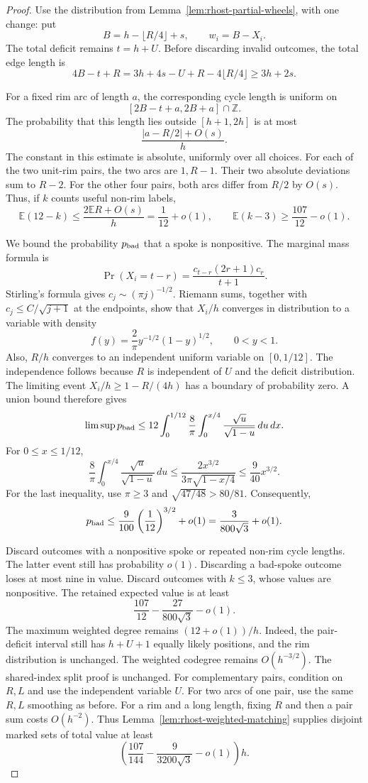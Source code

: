 \begin{proof}
Use the distribution from Lemma~\ref{lem:rhost-partial-wheels}, with one change:
put
\[
 B=h-\lfloor R/4\rfloor+s,\qquad w_i=B-X_i.
\]
The total deficit remains $t=h+U$.
Before discarding invalid outcomes, the total edge length is
\[
 4B-t+R=3h+4s-U+R-4\lfloor R/4\rfloor\ge3h+2s.
\]

For a fixed rim arc of length $a$, the corresponding cycle length is uniform on
\[
 [2B-t+a,2B+a]\cap\mathbb Z.
\]
The probability that this length lies outside $[h+1,2h]$ is at most
\[
 \frac{|a-R/2|+O(s)}h.
\]
The constant in this estimate is absolute, uniformly over all choices.
For each of the two unit-rim pairs, the two arcs are $1,R-1$.
Their two absolute deviations sum to $R-2$.
For the other four pairs, both arcs differ from $R/2$ by $O(s)$.
Thus, if $k$ counts useful non-rim labels,
\[
 \mathbb E(12-k)\le\frac{2\mathbb E R+O(s)}h=\frac1{12}+o(1),
 \qquad \mathbb E(k-3)\ge\frac{107}{12}-o(1).
\]

We bound the probability $p_{\rm bad}$ that a spoke is nonpositive.
The marginal mass formula is
\[
 \Pr(X_i=t-r)=\frac{c_{t-r}(2r+1)c_r}{t+1}.
\]
Stirling's formula gives $c_j\sim(\pi j)^{-1/2}$.
Riemann sums, together with $c_j\le C/\sqrt{j+1}$ at the endpoints, show that $X_i/h$
converges in distribution to a variable with density
\[
 f(y)=\frac2\pi y^{-1/2}(1-y)^{1/2},\qquad 0<y<1.
\]
Also, $R/h$ converges to an independent uniform variable on $[0,1/12]$.
The independence follows because $R$ is independent of $U$ and the deficit distribution.
The limiting event $X_i/h\ge1-R/(4h)$ has a boundary of probability zero.
A union bound therefore gives
\[
 \limsup p_{\rm bad}
 \le 12\int_0^{1/12}\frac8\pi
       \int_0^{x/4}\frac{\sqrt u}{\sqrt{1-u}}\,du\,dx.
\]
For $0\le x\le1/12$,
\[
 \frac8\pi\int_0^{x/4}\frac{\sqrt u}{\sqrt{1-u}}\,du
 \le\frac{2x^{3/2}}{3\pi\sqrt{1-x/4}}
 \le\frac9{40}x^{3/2}.
\]
For the last inequality, use $\pi\ge3$ and $\sqrt{47/48}>80/81$.
Consequently,
\[
 p_{\rm bad}\le\frac9{100}\left(\frac1{12}\right)^{3/2}+o(1)
             =\frac3{800\sqrt3}+o(1).
\]

Discard outcomes with a nonpositive spoke or repeated non-rim cycle lengths.
The latter event still has probability $o(1)$.
Discarding a bad-spoke outcome loses at most nine in value.
Discard outcomes with $k\le3$, whose values are nonpositive.
The retained expected value is at least
\[
 \frac{107}{12}-\frac{27}{800\sqrt3}-o(1).
\]
The maximum weighted degree remains $(12+o(1))/h$.
Indeed, the pair-deficit interval still has $h+U+1$ equally likely positions, and the rim distribution is unchanged.
The weighted codegree remains $O(h^{-3/2})$.
The shared-index split proof is unchanged.
For complementary pairs, condition on $R,L$ and use the independent variable $U$.
For two arcs of one pair, use the same $R,L$ smoothing as before.
For a rim and a long length, fixing $R$ and then a pair sum costs $O(h^{-2})$.
Thus Lemma~\ref{lem:rhost-weighted-matching} supplies disjoint marked sets of total value at least
\[
 \left(\frac{107}{144}-\frac9{3200\sqrt3}-o(1)\right)h.
\]


\end{proof}
